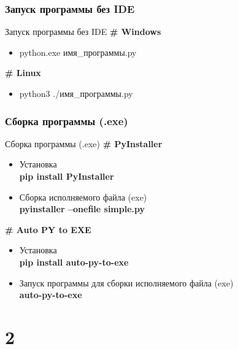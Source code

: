 \documentclass[12pt]{beamer}
\begin{document}


\section{Запуск программы без IDE}
\begin{frame}{Запуск программы без IDE}
\textbf{\# Windows} 
\begin{itemize}
\item python.exe имя\_программы.py
\end{itemize}
\vspace{0.3cm}
\textbf{\# Linux} 
\begin{itemize}
\item python3 ./имя\_программы.py
\end{itemize}
\end{frame}

\section{Сборка программы (.exe)}
\begin{frame}{Сборка программы (.exe)}
\textbf{\# PyInstaller} 
\begin{itemize}
\item Установка \\
	\textbf{pip install PyInstaller }
\item Сборка исполняемого файла (exe) \\
	\textbf{pyinstaller --onefile simple.py}
\end{itemize}
\vspace{0.3cm}
\textbf{\# Auto PY to EXE} 
\begin{itemize}
\item Установка \\
	\textbf{pip install auto-py-to-exe }
\item Запуск программы для сборки исполняемого файла (exe) \\
	\textbf{auto-py-to-exe}
\end{itemize}
\end{frame}


\part{2}
\end{document}
